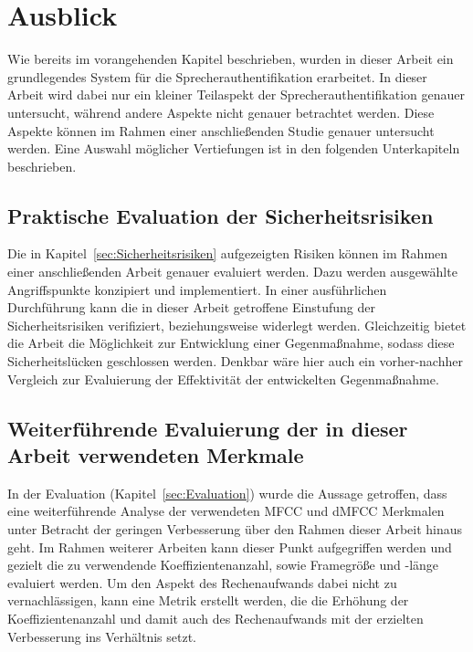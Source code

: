 \section{Ausblick}\label{sec:Ausblick}

\textauthor{\vHS}{}{}

Wie bereits im vorangehenden Kapitel beschrieben, wurden in dieser Arbeit ein grundlegendes System für die Sprecherauthentifikation erarbeitet.
In dieser Arbeit wird dabei nur ein kleiner Teilaspekt der Sprecherauthentifikation genauer untersucht, während andere Aspekte nicht genauer betrachtet werden.
Diese Aspekte können im Rahmen einer anschließenden Studie genauer untersucht werden.
Eine Auswahl möglicher Vertiefungen ist in den folgenden Unterkapiteln beschrieben.

\subsection{Praktische Evaluation der Sicherheitsrisiken}
Die in Kapitel~\ref{sec:Sicherheitsrisiken} aufgezeigten Risiken können im Rahmen einer anschließenden Arbeit genauer evaluiert werden.
Dazu werden ausgewählte Angriffspunkte konzipiert und implementiert.
In einer ausführlichen Durchführung kann die in dieser Arbeit getroffene Einstufung der Sicherheitsrisiken verifiziert, beziehungsweise widerlegt werden.
Gleichzeitig bietet die Arbeit die Möglichkeit zur Entwicklung einer Gegenmaßnahme, sodass diese Sicherheitslücken geschlossen werden.
Denkbar wäre hier auch ein vorher-nachher Vergleich zur Evaluierung der Effektivität der entwickelten Gegenmaßnahme.

\subsection{Weiterführende Evaluierung der in dieser Arbeit verwendeten Merkmale}
In der Evaluation (Kapitel~\ref{sec:Evaluation}) wurde die Aussage getroffen, dass eine weiterführende Analyse der verwendeten \ac{MFCC} und \ac{dMFCC} Merkmalen unter Betracht der geringen Verbesserung über den Rahmen dieser Arbeit hinaus geht.
Im Rahmen weiterer Arbeiten kann dieser Punkt aufgegriffen werden und gezielt die zu verwendende Koeffizientenanzahl, sowie Framegröße und -länge evaluiert werden.
Um den Aspekt des Rechenaufwands dabei nicht zu vernachlässigen, kann eine Metrik erstellt werden, die die Erhöhung der Koeffizientenanzahl und damit auch des Rechenaufwands mit der erzielten Verbesserung ins Verhältnis setzt.

